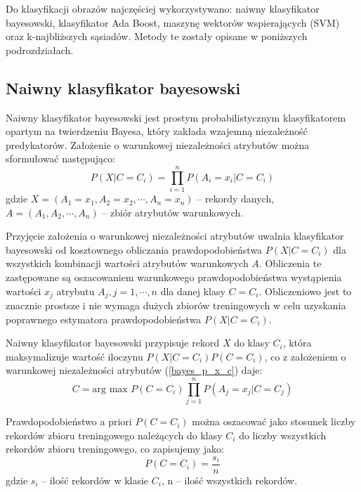 Do klasyfikacji obrazów najczęściej wykorzystywano: naiwny klasyfikator bayesowski, klasyfikator Ada Boost, maszynę wektorów wspierających (SVM) oraz k-najbliższych sąsiadów. Metody te zostały opisane w poniższych podrozdziałach.
	
\subsection{Naiwny klasyfikator bayesowski}
Naiwny klasyfikator bayesowski jest prostym probabilistycznym klasyfikatorem opartym na twierdzeniu Bayesa, który zakłada wzajemną niezależność predykatorów. Założenie o warunkowej niezależności atrybutów można sformułować następująco:
\begin{equation} 
\label{bayes_p_x_c} 
P(X | C = C_i) = \prod\limits_{i = 1}^n P( A_i = x_i | C = C_i )
\end{equation} gdzie $X = (A_1 = x_1, A_2 = x_2, \cdots, A_n = x_n)$ -- rekordy danych, $A = (A_1, A_2, \cdots, A_n)$ -- zbiór atrybutów warunkowych.

Przyjęcie założenia o warunkowej niezależności atrybutów uwalnia klasyfikator bayesowski od kosztownego obliczania prawdopodobieństwa $P(X | C = C_i)$ dla wszystkich kombinacji wartości atrybutów warunkowych $A$. Obliczenia te zastępowane są oszacowaniem warunkowego prawdopodobieństwa wystąpienia wartości $x_j$ atrybutu $A_j, j = 1, \cdots, n$ dla danej klasy $C = C_i$. Obliczeniowo jest to znacznie prostsze i nie wymaga dużych zbiorów treningowych w celu uzyskania poprawnego estymatora prawdopodobieństwa $P(X | C = C_i)$.

Naiwny klasyfikator bayesowski przypisuje rekord $X$ do klasy $C_i$, która maksymalizuje wartość iloczynu $P(X | C = C_i) P(C = C_i)$, co z założeniem o warunkowej niezależności atrybutów (\ref{bayes_p_x_c}) daje:
\begin{equation} 
\label{bayes_C} 
C = \text{arg max } P(C = C_i) \prod\limits_{j = 1}^n P(A_j = x_j | C = C_j)
\end{equation}

Prawdopodobieństwo a priori $P(C = C_i)$ można oszacować jako stosunek liczby rekordów zbioru treningowego należących do klasy $C_i$ do liczby wszystkich rekordów zbioru treningowego, co zapisujemy jako:
\begin{equation} 
\label{bayes_C_n} 
P(C = C_i) = \frac{s_i}{n}
\end{equation} gdzie $s_i$ -- ilość rekordów w klasie $C_i$, n -- ilość wszystkich rekordów.

